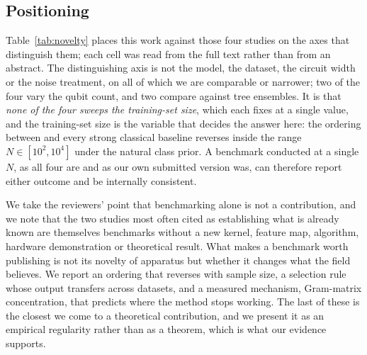 \subsection{Positioning}

\begin{revbody}


Table~\ref{tab:novelty} places this work against those four studies on the axes
that distinguish them; each cell was read from the full text rather than from an
abstract. The distinguishing axis is not the model, the dataset, the circuit
width or the noise treatment, on all of which we are comparable or narrower;
two of the four vary the qubit count, and two compare against tree ensembles. It
is that \emph{none of the four sweeps the training-set size}, which each fixes at
a single value, and the training-set size is the variable that decides the answer
here: the ordering between \QSVM{} and every strong classical baseline reverses
inside the range $N\in[10^{2},10^{4}]$ under the natural class prior. A benchmark
conducted at a single $N$, as all four are and as our own submitted version
was, can therefore report either outcome and be internally consistent.

We take the reviewers' point that benchmarking alone is not a contribution, and
we note that the two studies most often cited as establishing what is already
known \cite{bowles2024,schnabel2024} are themselves benchmarks without a new
kernel, feature map, algorithm, hardware demonstration or theoretical result.
What makes a benchmark worth publishing is not its novelty of apparatus but
whether it changes what the field believes. We report an ordering that reverses
with sample size, a selection rule whose output transfers across datasets, and a
measured mechanism, Gram-matrix concentration, that predicts where the
method stops working. The last of these is the closest we come to a theoretical
contribution, and we present it as an empirical regularity rather than as a
theorem, which is what our evidence supports.
\end{revbody}
